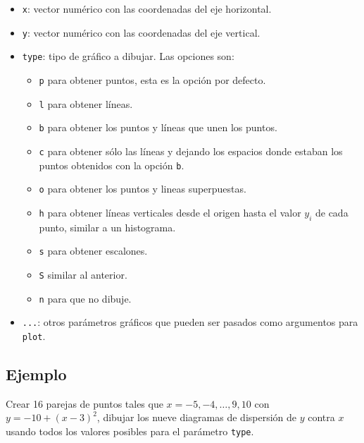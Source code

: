\documentclass[10pt,]{krantz}
\providecommand{\tightlist}{%
  \setlength{\itemsep}{0pt}\setlength{\parskip}{0pt}}
\begin{document}
\begin{itemize}
\tightlist
\item
  \texttt{x}: vector numérico con las coordenadas del eje horizontal.
\item
  \texttt{y}: vector numérico con las coordenadas del eje vertical.
\item
  \texttt{type}: tipo de gráfico a dibujar. Las opciones son:
  \label{type}

  \begin{itemize}
  \tightlist
  \item
    \texttt{\textquotesingle{}p\textquotesingle{}} para obtener puntos,
    esta es la opción por defecto.
  \item
    \texttt{\textquotesingle{}l\textquotesingle{}} para obtener líneas.
  \item
    \texttt{\textquotesingle{}b\textquotesingle{}} para obtener los
    puntos y líneas que unen los puntos.
  \item
    \texttt{\textquotesingle{}c\textquotesingle{}} para obtener sólo las
    líneas y dejando los espacios donde estaban los puntos obtenidos con
    la opción \texttt{\textquotesingle{}b\textquotesingle{}}.
  \item
    \texttt{\textquotesingle{}o\textquotesingle{}} para obtener los
    puntos y lineas superpuestas.
  \item
    \texttt{\textquotesingle{}h\textquotesingle{}} para obtener líneas
    verticales desde el origen hasta el valor \(y_i\) de cada punto,
    similar a un histograma.
  \item
    \texttt{\textquotesingle{}s\textquotesingle{}} para obtener
    escalones.
  \item
    \texttt{\textquotesingle{}S\textquotesingle{}} similar al anterior.
  \item
    \texttt{\textquotesingle{}n\textquotesingle{}} para que no dibuje.
  \end{itemize}
\item
  \texttt{...}: otros parámetros gráficos que pueden ser pasados como
  argumentos para \texttt{plot}.
\end{itemize}

\subsection*{Ejemplo}\label{ejemplo-9}


Crear 16 parejas de puntos tales que \(x=-5, -4, \ldots, 9, 10\) con
\(y=-10+(x-3)^2\), dibujar los nueve diagramas de dispersión de \(y\)
contra \(x\) usando todos los valores posibles para el parámetro
\texttt{type}.
\end{document}
